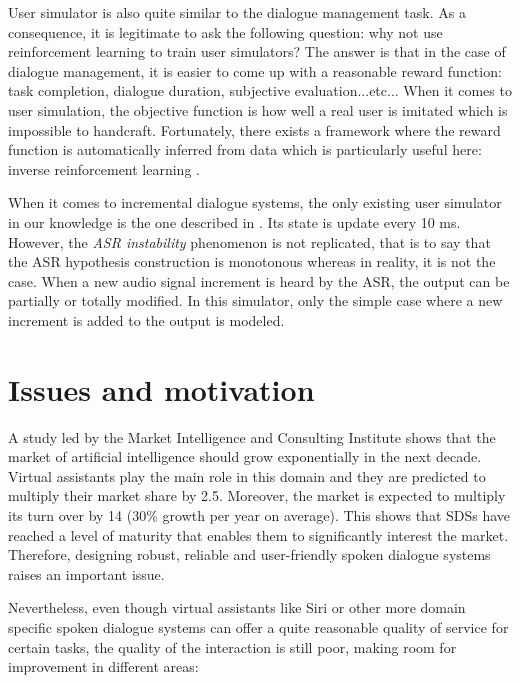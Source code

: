         User simulator is also quite similar to the dialogue management task. As a consequence, it is legitimate to ask the following question: why not use reinforcement learning to train user simulators? The answer is that in the case of dialogue management, it is easier to come up with a reasonable reward function: task completion, dialogue duration, subjective evaluation...etc... When it comes to user simulation, the objective function is how well a real user is imitated which is impossible to handcraft. Fortunately, there exists a framework where the reward function is automatically inferred from data which is particularly useful here: inverse reinforcement learning \cite{Chandramohan2011}.
        
        When it comes to incremental dialogue systems, the only existing user simulator in our knowledge is the one described in \cite{Selfridge2012b}. Its state is update every 10 ms. However, the \textit{ASR instability} phenomenon is not replicated, that is to say that the ASR hypothesis construction is monotonous whereas in reality, it is not the case. When a new audio signal increment is heard by the ASR, the output can be partially or totally modified. In this simulator, only the simple case where a new increment is added to the output is modeled.

\section{Issues and motivation}
    
    A study led by the Market Intelligence and Consulting Institute shows that the market of artificial intelligence should grow exponentially in the next decade. Virtual assistants play the main role in this domain and they are predicted to multiply their market share by 2.5. Moreover, the market is expected to multiply its turn over by 14 (30\% growth per year on average). This shows that SDSs have reached a level of maturity that enables them to significantly interest the market. Therefore, designing robust, reliable and user-friendly spoken dialogue systems raises an important issue.
    
    Nevertheless, even though virtual assistants like Siri or other more domain specific spoken dialogue systems can offer a quite reasonable quality of service for certain tasks, the quality of the interaction is still poor, making room for improvement in different areas:
    

